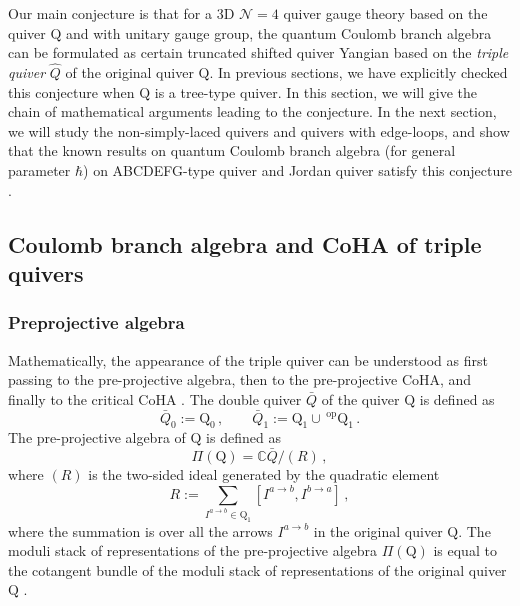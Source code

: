 \documentclass[12pt,a4paper]{article}
\renewcommand{\(}{\left(}
\renewcommand{\)}{\right)}
\renewcommand{\(}{\left(}
\renewcommand{\)}{\right)}
\begin{document}
Our main conjecture is that 
for a 3D $\mathcal{N}=4$ quiver gauge theory based on the quiver $\mathrm{Q}$ and with unitary gauge group, the quantum Coulomb branch algebra can be formulated as certain truncated shifted quiver Yangian 
based on the \textit{triple quiver} $\widehat{Q}$ of the original quiver $\mathrm{Q}$.
In previous sections, we have explicitly checked this conjecture when $\mathrm{Q}$ is a tree-type quiver.
In this section, we will give the chain of mathematical arguments leading to the conjecture. 
In the next section, we will study the non-simply-laced quivers and quivers with edge-loops, and show that the known results on quantum Coulomb branch algebra (for general parameter $\hbar$) on ABCDEFG-type quiver and Jordan quiver satisfy this conjecture \cite{Braverman:2016pwk,Nakajima:2019olw,Kodera:2016faj_jordan_quiver}.


\subsection{Coulomb branch algebra and CoHA of triple quivers}\label{ssec:CBA_CoHA_general}

\subsubsection{Preprojective algebra}

Mathematically, the appearance of the triple quiver can be understood as first passing to the pre-projective algebra, then to the pre-projective CoHA,  and finally to the critical CoHA \cite{Ginzburg:2006fu,Yang_2014,Yang_2016,yang2017}.
The double quiver $\bar{Q}$ of the quiver $\mathrm{Q}$ is defined as 
\begin{equation}
\label{eq:doubleQuiver}
\bar{Q}_0:=\mathrm{Q}_0\,, \qquad \bar{Q}_1:=\mathrm{Q}_1\cup \,  {}^{\textrm{op}}\mathrm{Q}_1\,. 
\end{equation}
The pre-projective algebra of $\mathrm{Q}$ is defined as
\begin{equation}
\Pi(\mathrm{Q})=\mathbb{C}\bar{Q}/(R)\,, 
\end{equation}
where $(R)$ is the two-sided ideal generated by the quadratic element 
\begin{equation}
R:= \sum_{I^{a\to b}\in \mathrm{Q}_1}[I^{a\to b},I^{b\to a}]\,, 
\end{equation}
where the summation is over all the arrows $I^{a\to b}$ in the original quiver $\mathrm{Q}$.
The moduli stack of representations of the pre-projective algebra $\Pi(\mathrm{Q})$ is equal to the cotangent bundle of the moduli stack of representations of the original quiver $\mathrm{Q}$ \cite{Ginzburg:2006fu}.
\end{document}
